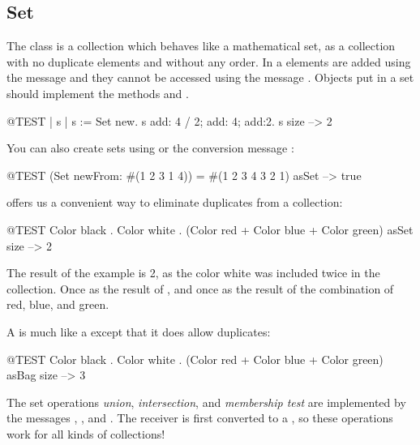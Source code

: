 \documentclass[a4paper,10pt,twoside]{book}
\begin{document}
\subsection{Set}
The class  is a collection which behaves like a mathematical set, \ie as a collection with no duplicate elements and without any order.
In a  elements are added using the message  and they cannot be accessed using the message .
Objects put in a set should implement the methods  and \ct{=}.

\begin{code}{@TEST | s | }
s := Set new.
s add: 4 / 2; add: 4; add:2.
s size --> 2
\end{code}

You can also create sets using  or the conversion message :

\begin{code}{@TEST}
(Set newFrom: #(1 2 3 1 4)) = #(1 2 3 4 3 2 1) asSet --> true
\end{code}

 offers us a convenient way to eliminate duplicates from a collection:

\begin{code}{@TEST}
{Color black . Color white . (Color red + Color blue + Color green)} asSet size --> 2
\end{code}

\noindent
The result of the example is 2, as the color white was included twice in the collection. Once as the result of , and once as the result of the combination of red, blue, and green.

A  is much like a  except that it does allow duplicates:
\begin{code}{@TEST}
{Color black . Color white . (Color red + Color blue + Color green)} asBag size --> 3
\end{code}

The set operations \emph{union}, \emph{intersection}, and \emph{membership test} are implemented by the  messages , , and .
The receiver is first converted to a , so these operations work for all kinds of collections!
\end{document}
